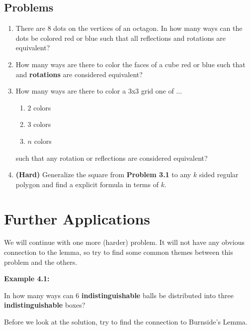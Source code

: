 \documentclass[11pt]{scrartcl}
\begin{document}
\subsection{Problems}
\begin{enumerate}
    \item There are $8$ dots on the vertices of an octagon. In how many ways can the dots be colored red or blue such that all reflections and rotations are equivalent?
    \item How many ways are there to color the faces of a cube red or blue such that and \color{blue} \textbf{rotations} \color{black} are considered equivalent?
    \item How many ways are there to color a $3$x$3$ grid one of ...
    \begin{enumerate}
        \item $2$ colors
        \item $3$ colors
        \item $n$ colors
    \end{enumerate}
    such that any rotation or reflections are considered equivalent?
    \item \textbf{(Hard)} Generalize the square from \color{red} \textbf{Problem 3.1} \color{black} to any $k$ sided regular polygon and find a explicit formula in terms of $k$.
\end{enumerate}

\section{Further Applications}

We will continue with one more (harder) problem. It will not have any obvious connection to the lemma, so try to find some common themes between this problem and the others.

\begin{tcolorbox}[colback=red!5!white,colframe=red!75!black]
  \color{red} \textbf{Example 4.1:} \color{black}
  \vspace{0.1cm}
  
  In how many ways can $6$ \color{blue} \textbf{indistinguishable} \color{black} balls be distributed into three \color{blue} \textbf{indistinguishable} \color{black} boxes?
\end{tcolorbox}

Before we look at the solution, try to find the connection to Burnside's Lemma. 

\vspace{0.2cm}
\end{document}
